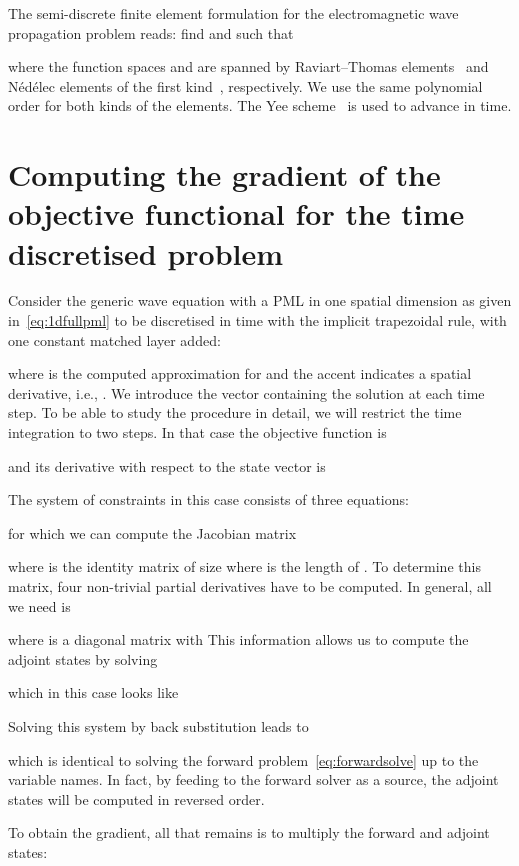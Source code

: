 \documentclass[a4paper]{article}
\begin{document}
The semi-discrete finite element formulation for the electromagnetic
wave propagation problem reads: find  and  such that

where the function spaces  and  are spanned by
Raviart--Thomas elements~\citep{raviart77thomas} and N\'ed\'elec
elements of the first kind~\citep{nedelec80}, respectively. We use the
same polynomial order for both kinds of the elements.  The Yee
scheme~\citep{yee66} is used to advance in time.

\section{Computing the gradient of the objective functional for the
  time discretised problem}
\label{sec:gradient}

Consider the generic wave equation with a PML in one spatial dimension
as given in~\eqref{eq:1dfullpml} to be discretised in time with the
implicit trapezoidal rule, with one constant matched layer added:

where  is the computed approximation for
 and the accent indicates a spatial
derivative, i.e., .  We introduce the vector 
containing the solution at each time step.  To be able to study the
procedure in detail, we will restrict the time integration to two
steps.  In that case the objective function is

and its derivative with respect to the state vector  is

The system of constraints in this case consists of three equations:

for which we can compute the Jacobian matrix

where  is the identity matrix of size  where
 is the length of . To determine this matrix, four
non-trivial partial derivatives have to be computed. In general, all
we need is

where  is a diagonal matrix with 
This information allows us to compute the adjoint states
 by solving

which in this case looks like

Solving this system by back substitution leads to

which is identical to solving the forward
problem~\eqref{eq:forwardsolve} up to the variable names. In fact, by
feeding  to the forward solver as a source, the adjoint
states will be computed in reversed order.

To obtain the gradient, all that remains is to multiply the forward
and adjoint states:
\end{document}
